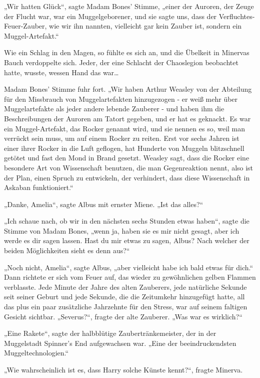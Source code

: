 {„Wir hatten Glück“, sagte Madam Bones' Stimme, „einer der Auroren, der Zeuge der Flucht war, war ein Muggelgeborener, und sie sagte uns, dass der Verfluchtes-Feuer-Zauber, wie wir ihn nannten, vielleicht gar kein Zauber ist, sondern ein Muggel-Artefakt.“

Wie ein Schlag in den Magen, so fühlte es sich an, und die Übelkeit in Minervas Bauch verdoppelte sich. Jeder, der eine Schlacht der Chaoslegion beobachtet hatte, wusste, wessen Hand das war…

Madam Bones' Stimme fuhr fort. „Wir haben Arthur Weasley von der Abteilung für den Missbrauch von Muggelartefakten hinzugezogen - er weiß mehr über Muggelartefakte als jeder andere lebende Zauberer - und haben ihm die Beschreibungen der Auroren am Tatort gegeben, und er hat es geknackt. Es war ein Muggel-Artefakt, das Rocker genannt wird, und sie nennen es so, weil man verrückt sein muss, um auf einem Rocker zu reiten. Erst vor sechs Jahren ist einer ihrer Rocker in die Luft geflogen, hat Hunderte von Muggeln blitzschnell getötet und fast den Mond in Brand gesetzt. Weasley sagt, dass die Rocker eine besondere Art von Wissenschaft benutzen, die man Gegenreaktion nennt, also ist der Plan, einen Spruch zu entwickeln, der verhindert, dass diese Wissenschaft in Askaban funktioniert.“

„Danke, Amelia“, sagte Albus mit ernster Miene. „Ist das alles?“

„Ich schaue nach, ob wir in den nächsten sechs Stunden etwas haben“, sagte die Stimme von Madam Bones, „wenn ja, haben sie es mir nicht gesagt, aber ich werde es dir sagen lassen. Hast du mir etwas zu sagen, Albus? Nach welcher der beiden Möglichkeiten sieht es denn aus?“

„Noch nicht, Amelia“, sagte Albus, „aber vielleicht habe ich bald etwas für dich.“ Dann richtete er sich vom Feuer auf, das wieder zu gewöhnlichen gelben Flammen verblasste. Jede Minute der Jahre des alten Zauberers, jede natürliche Sekunde seit seiner Geburt und jede Sekunde, die die Zeitumkehr hinzugefügt hatte, all das plus ein paar zusätzliche Jahrzehnte für den Stress, war auf seinem faltigen Gesicht sichtbar. „Severus?“, fragte der alte Zauberer. „Was war es wirklich?“

„Eine Rakete“, sagte der halbblütige Zaubertränkemeister, der in der Muggelstadt Spinner's End aufgewachsen war. „Eine der beeindruckendsten Muggeltechnologien.“

„Wie wahrscheinlich ist es, dass Harry solche Künste kennt?“, fragte Minerva.

}
